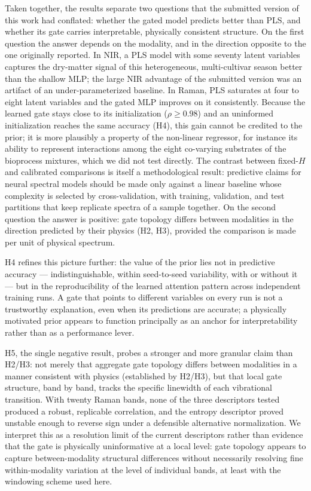 \documentclass[preprint,12pt]{elsarticle}
\begin{document}
Taken together, the results separate two questions that the submitted version of this work had conflated: whether the gated model predicts better than PLS, and whether its gate carries interpretable, physically consistent structure. On the first question the answer depends on the modality, and in the direction opposite to the one originally reported. In NIR, a PLS model with some seventy latent variables captures the dry-matter signal of this heterogeneous, multi-cultivar season better than the shallow MLP; the large NIR advantage of the submitted version was an artifact of an under-parameterized baseline. In Raman, PLS saturates at four to eight latent variables and the gated MLP improves on it consistently. Because the learned gate stays close to its initialization ($\rho\geq0.98$) and an uninformed initialization reaches the same accuracy (H4), this gain cannot be credited to the prior; it is more plausibly a property of the non-linear regressor, for instance its ability to represent interactions among the eight co-varying substrates of the bioprocess mixtures, which we did not test directly. The contrast between fixed-$H$ and calibrated comparisons is itself a methodological result: predictive claims for neural spectral models should be made only against a linear baseline whose complexity is selected by cross-validation, with training, validation, and test partitions that keep replicate spectra of a sample together. On the second question the answer is positive: gate topology differs between modalities in the direction predicted by their physics (H2, H3), provided the comparison is made per unit of physical spectrum.

H4 refines this picture further: the value of the prior lies not in predictive accuracy --- indistinguishable, within seed-to-seed variability, with or without it --- but in the reproducibility of the learned attention pattern across independent training runs. A gate that points to different variables on every run is not a trustworthy explanation, even when its predictions are accurate; a physically motivated prior appears to function principally as an anchor for interpretability rather than as a performance lever.

H5, the single negative result, probes a stronger and more granular claim than H2/H3: not merely that aggregate gate topology differs between modalities in a manner consistent with physics (established by H2/H3), but that local gate structure, band by band, tracks the specific linewidth of each vibrational transition. With twenty Raman bands, none of the three descriptors tested produced a robust, replicable correlation, and the entropy descriptor proved unstable enough to reverse sign under a defensible alternative normalization. We interpret this as a resolution limit of the current descriptors rather than evidence that the gate is physically uninformative at a local level: gate topology appears to capture between-modality structural differences without necessarily resolving fine within-modality variation at the level of individual bands, at least with the windowing scheme used here.
\end{document}
